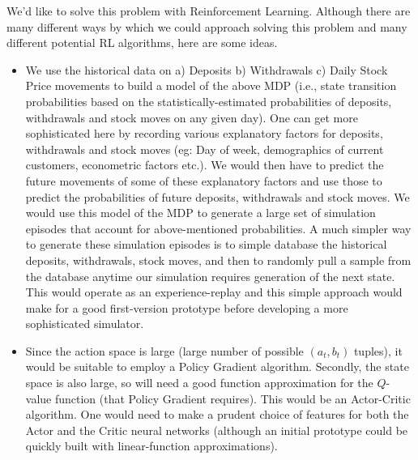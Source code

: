 \documentclass[12pt]{exam}
\begin{document}
\begin{questions}
We'd like to solve this problem with Reinforcement Learning. Although there are many different ways by which we could approach solving this problem and many different potential RL algorithms, here are some ideas.
\begin{itemize}
\item We use the historical data on a) Deposits b) Withdrawals c) Daily Stock Price movements to build a model of the above MDP (i.e., state transition probabilities based on the statistically-estimated probabilities of deposits, withdrawals and stock moves on any given day). One can get more sophisticated here by recording various explanatory factors for deposits, withdrawals and stock moves (eg: Day of week, demographics of current customers, econometric factors etc.). We would then have to predict the future movements of some of these explanatory factors and use those to predict the probabilities of future deposits, withdrawals and stock moves. We would use this model of the MDP to generate a large set of simulation episodes that account for above-mentioned probabilities. A much simpler way to generate these simulation episodes is to simple database the historical deposits, withdrawals, stock moves, and then to randomly pull a sample from the database anytime our simulation requires generation of the next state. This would operate as an experience-replay and this simple approach would make for a good first-version prototype before developing a more sophisticated simulator.
\item Since the action space is large (large number of possible $(a_t,b_t)$ tuples), it would be suitable to employ a Policy Gradient algorithm. Secondly, the state space is also large, so will need a good function approximation for the $Q$-value function (that Policy Gradient requires). This would be an Actor-Critic algorithm. One would need to make a prudent choice of features for both the Actor and the Critic neural networks (although an initial prototype could be quickly built with linear-function approximations).
\end{itemize}
 
\end{questions}
\end{document}

